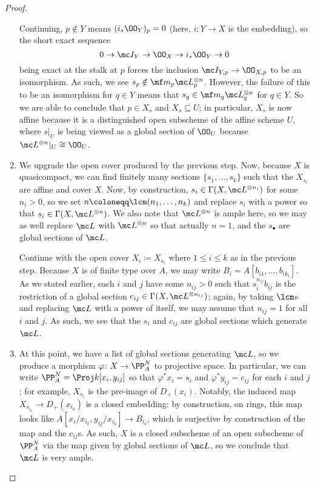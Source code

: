 \documentclass[../notes.tex]{subfiles}
\begin{document}
\begin{proof}
\begin{enumerate}
		Continuing, $p\notin Y$ means $(i_*\OO_Y)_p=0$ (here, $i\colon Y\to X$ is the embedding), so the short exact sequence
		\[0\to\mc I_Y\to\OO_X\to i_*\OO_Y\to0\]
		being exact at the stalk at $p$ forces the inclusion $\mc I_{Y,p}\to\OO_{X,p}$ to be an isomorphism. As such, we see $s_p\notin\mf m_p\mc L^{\otimes n}_p$. However, the failure of this to be an isomorphism for $q\in Y$ means that $s_q\in\mf m_q\mc L^{\otimes n}_q$ for $q\in Y$. So we are able to conclude that $p\in X_s$ and $X_s\subseteq U$; in particular, $X_s$ is now affine because it is a distinguished open subscheme of the affine scheme $U$, where $s|_U$ is being viewed as a global section of $\OO_U$ because $\mc L^{\otimes n}|_U\cong\OO_U$.

		\item We upgrade the open cover produced by the previous step. Now, because $X$ is quasicompact, we can find finitely many sections $\{s_1,\ldots,s_k\}$ such that the $X_{s_i}$ are affine and cover $X$. Now, by construction, $s_i\in\Gamma(X,\mc L^{\otimes n_i})$ for some $n_i>0$, so we set $n\coloneqq\lcm(n_1,\ldots,n_k)$ and replace $s_i$ with a power so that $s_i\in\Gamma(X,\mc L^{\otimes n})$. We also note that $\mc L^{\otimes n}$ is ample here, so we may as well replace $\mc L$ with $\mc L^{\otimes n}$ so that actually $n=1$, and the $s_\bullet$ are global sections of $\mc L$.

		Continue with the open cover $X_i\coloneqq X_{s_i}$ where $1\le i\le k$ as in the previous step. Because $X$ is of finite type over $A$, we may write $B_i=A[b_{i1},\ldots,b_{ik_i}]$. As we stated earlier, each $i$ and $j$ have some $n_{ij}>0$ such that $s_i^{n_{ij}}b_{ij}$ is the restriction of a global section $c_{ij}\in\Gamma(X,\mc L^{\otimes n_{ij}})$; again, by taking $\lcm$s and replacing $\mc L$ with a power of itself, we may assume that $n_{ij}=1$ for all $i$ and $j$. As such, we see that the $s_i$ and $c_{ij}$ are global sections which generate $\mc L$.

		\item At this point, we have a list of global sections generating $\mc L$, so we produce a morphism $\varphi\colon X\to\PP^N_A$ to projective space. In particular, we can write $\PP^N_A=\Proj k[x_i,y_{ij}]$ so that $\varphi^*x_i=s_i$ and $\varphi^*y_{ij}=c_{ij}$ for each $i$ and $j$; for example, $X_{s_i}$ is the pre-image of $D_+(x_i)$. Notably, the induced map $X_{s_{i_0}}\to D_+(x_{i_0})$ is a closed embedding: by construction, on rings, this map looks like $A[x_i/x_{i_0},y_{ij}/x_{i_0}]\to B_{i_0}$, which is surjective by construction of the map and the $c_{ij}$s. As such, $X$ is a closed subscheme of an open subscheme of $\PP^N_A$ via the map given by global sections of $\mc L$, so we conclude that $\mc L$ is very ample.
		\qedhere
	\end{enumerate}
\end{proof}
\end{document}
